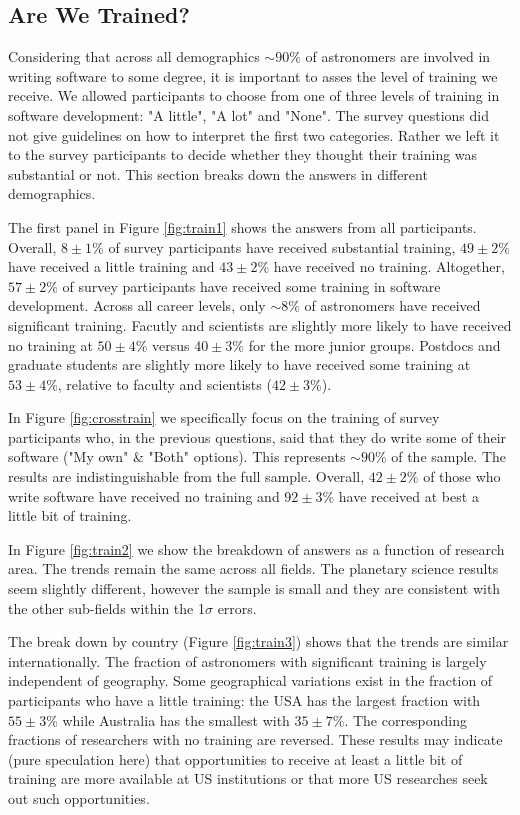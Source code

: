 \subsection{Are We Trained?}

Considering that across all demographics $\sim90\%$ of astronomers are involved in writing software to some degree, it is important to asses the level of training we receive. We allowed participants to choose from one of three levels of training in software development: "A little", "A lot" and "None". The survey questions did not give guidelines on how to interpret the first two categories. Rather we left it to the survey participants to decide whether they thought their training was substantial or not. This section breaks down the answers in different demographics. 

The first panel in Figure \ref{fig:train1} shows the answers from all participants. Overall, $8\pm1\%$ of survey participants have received substantial training, $49\pm2\%$ have received a little training and $43\pm2\%$ have received no training. Altogether, $57\pm2\%$ of survey participants have received some training in software development. Across all career levels, only $\sim8\%$ of astronomers have received significant training. Facutly and scientists are slightly more likely to have received no training at $50\pm4\%$ versus $40\pm3\%$ for the more junior groups. Postdocs and graduate students are slightly more likely to have received some training at $53\pm4\%$, relative to faculty and scientists ($42\pm3\%$).

In Figure \ref{fig:crosstrain} we specifically focus on the training of survey participants who, in the previous questions, said that they do write some of their software ("My own" & "Both" options). This represents $\sim90\%$ of the sample. The results are indistinguishable from the full sample. Overall, $42\pm2\%$ of those who write software have received no training and $92\pm3\%$ have received at best a little bit of training.

In Figure \ref{fig:train2} we show the breakdown of answers as a function of research area. The trends remain the same across all fields. The planetary science results seem slightly different, however the sample is small and they are consistent with the other sub-fields within the 1$\sigma$ errors. 

The break down by country (Figure \ref{fig:train3}) shows that the trends are similar internationally. The fraction of astronomers with significant training is largely independent of geography. Some geographical variations exist in the fraction of participants who have a little training: the USA has the largest fraction with $55\pm3\%$ while Australia has the smallest with $35\pm7\%$. The corresponding fractions of researchers with no training are reversed. These results may indicate (pure speculation here) that opportunities to receive at least a little bit of training are more available at US institutions or that more US researches seek out such opportunities. 

